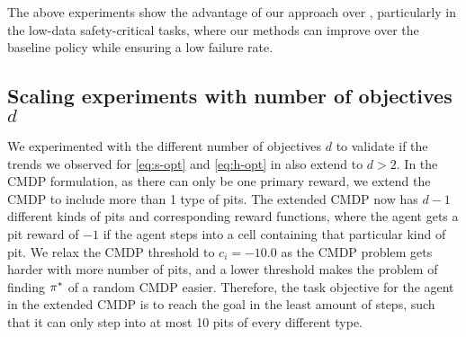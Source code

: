 
The above experiments show the advantage of our approach over \cite{le2019batch}, particularly in the low-data safety-critical tasks, where our methods can improve over the baseline policy while ensuring a low failure rate. 






\subsection{Scaling experiments with number of objectives $d$}
\label{app:cmdp-scaling-experiments}

We experimented with the different number of objectives $d$ to validate if the trends we observed for \ref{eq:s-opt} and \ref{eq:h-opt} in  also extend to $d>2$. 
In the CMDP formulation, as there can only be one primary reward, we extend the CMDP to include more than 1 type of pits. The extended CMDP now has $d-1$ different kinds of pits and corresponding reward functions, where the agent gets a pit reward of $-1$ if the agent steps into a cell containing that particular kind of pit. We relax the CMDP threshold to $c_i = -10.0$ as the CMDP problem gets harder with more number of pits, and a lower threshold makes the problem of finding $\pi^{*}$ of a random CMDP easier. Therefore, the task objective for the agent in the extended CMDP is to reach the goal in the least amount of steps, such that it can only step into at most 10 pits of every different type. 


